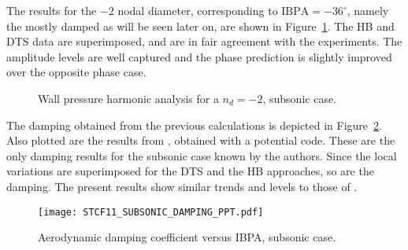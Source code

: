 The results for the  $-2$ nodal  diameter, corresponding to $\text{IBPA}=-36^\circ$, namely
the mostly damped as will be seen later on, are shown
in Figure~\ref{fig:stcf11_ael_subsonic_ibpa_324_paper}. The HB and DTS data
are superimposed, and are in fair agreement with the experiments. The
amplitude levels are well captured and the phase prediction is
slightly improved over the opposite phase case.
\begin{figure}[htp]
  \centering
  \caption{Wall pressure harmonic analysis for a \mbox{$n_d=-2$}, subsonic case.}
  \label{fig:stcf11_ael_subsonic_ibpa_324_paper}
\end{figure}

The damping obtained from the previous calculations is depicted 
in Figure~\ref{fig:stcf11_subsonic_damping}.  Also plotted are the results
from \citet{Fransson1999}, obtained with a
potential code.
These are the only damping results for the
subsonic case known by the authors.  Since the local variations are
superimposed for the DTS and the HB approaches, so are the damping.
The present
results show similar trends and levels to those of \citet{Fransson1999}.
\begin{figure}[htp]
  \centering
  \texttt{[image: STCF11\_SUBSONIC\_DAMPING\_PPT.pdf]}
  \caption{Aerodynamic damping coefficient versus IBPA, subsonic case.}
  \label{fig:stcf11_subsonic_damping}
\end{figure}